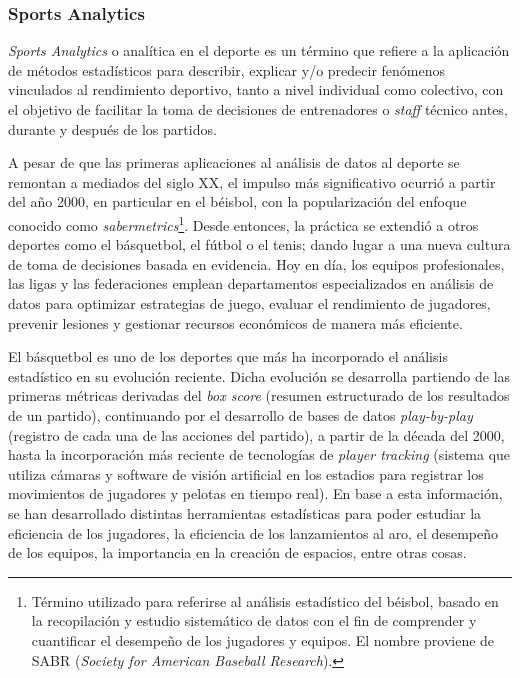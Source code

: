 \documentclass[
  12pt,
]{article}
\begin{document}
\subsubsection*{Sports Analytics}\label{sports-analytics}

\emph{Sports Analytics} o analítica en el deporte es un término que
refiere a la aplicación de métodos estadísticos para describir, explicar
y/o predecir fenómenos vinculados al rendimiento deportivo, tanto a
nivel individual como colectivo, con el objetivo de facilitar la toma de
decisiones de entrenadores o \emph{staff} técnico antes, durante y
después de los partidos.

A pesar de que las primeras aplicaciones al análisis de datos al deporte
se remontan a mediados del siglo XX, el impulso más significativo
ocurrió a partir del año 2000, en particular en el béisbol, con la
popularización del enfoque conocido como \emph{sabermetrics}\footnote{Término
  utilizado para referirse al análisis estadístico del béisbol, basado
  en la recopilación y estudio sistemático de datos con el fin de
  comprender y cuantificar el desempeño de los jugadores y equipos. El
  nombre proviene de SABR (\emph{Society for American Baseball
  Research}).}. Desde entonces, la práctica se extendió a otros deportes
como el básquetbol, el fútbol o el tenis; dando lugar a una nueva
cultura de toma de decisiones basada en evidencia. Hoy en día, los
equipos profesionales, las ligas y las federaciones emplean
departamentos especializados en análisis de datos para optimizar
estrategias de juego, evaluar el rendimiento de jugadores, prevenir
lesiones y gestionar recursos económicos de manera más eficiente.

El básquetbol es uno de los deportes que más ha incorporado el análisis
estadístico en su evolución reciente. Dicha evolución se desarrolla
partiendo de las primeras métricas derivadas del \emph{box score}
(resumen estructurado de los resultados de un partido), continuando por
el desarrollo de bases de datos \emph{play-by-play} (registro de cada
una de las acciones del partido), a partir de la década del 2000, hasta
la incorporación más reciente de tecnologías de \emph{player tracking}
(sistema que utiliza cámaras y software de visión artificial en los
estadios para registrar los movimientos de jugadores y pelotas en tiempo
real). En base a esta información, se han desarrollado distintas
herramientas estadísticas para poder estudiar la eficiencia de los
jugadores, la eficiencia de los lanzamientos al aro, el desempeño de los
equipos, la importancia en la creación de espacios, entre otras cosas.
\end{document}

